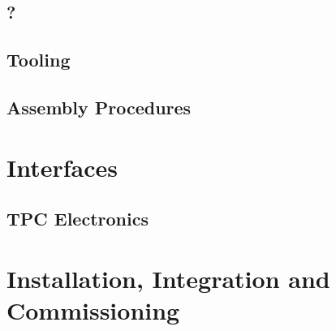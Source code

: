 \subsection{}
\label{sec:fdsp-daq-?}

\subsection{?}
\label{sec:fdsp-daq-??}


\subsection{Tooling}
\label{sec:fdsp-daq-tooling}


\subsection{Assembly Procedures}
\label{sec:fdsp-daq-assy}



\section{Interfaces}
\label{sec:fdsp-daq-intfc}



\subsection{TPC Electronics}
\label{sec:fdsp-daq-intfc-elec}


\subsection{}
\label{sec:fdsp-daq-intfc-?}


\section{Installation, Integration and Commissioning}
\label{sec:fdsp-daq-install}

